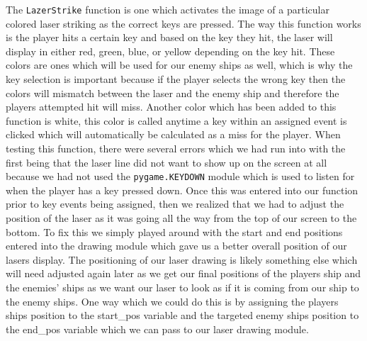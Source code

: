The \texttt{LazerStrike} function is one which activates
the image of a particular colored laser striking as the correct keys
are pressed.  The way this function works is the player hits a
certain key and based on the key they hit, the laser will display in
either red, green, blue, or yellow depending on the key hit. These
colors are ones which will be used for our enemy ships as well,
which is why the key selection is important because if the player
selects the wrong key then the colors will mismatch between the
laser and the enemy ship and therefore the players attempted hit
will miss.  Another color which has been added to this function is
white, this color is called anytime a key within an assigned event
is clicked which will automatically be calculated as a miss for the
player.  When testing this function, there were several errors which
we had run into with the first being that the laser line did not
want to show up on the screen at all because we had not used the
\texttt{pygame.KEYDOWN} module which is used to listen
for when the player has a key pressed down. Once this was entered
into our function prior to key events being assigned, then we
realized that we had to adjust the position of the laser as it was
going all the way from the top of our screen to the bottom. To fix
this we simply played around with the start and end positions
entered into the drawing module which gave us a better overall
position of our lasers display. The positioning of our laser drawing
is likely something else which will need adjusted again later as we
get our final positions of the players ship and the enemies’ ships
as we want our laser to look as if it is coming from our ship to the
enemy ships.  One way which we could do this is by assigning the
players ships position to the start_pos variable and the targeted
enemy ships position to the end_pos variable which we can pass to
our laser drawing module.

